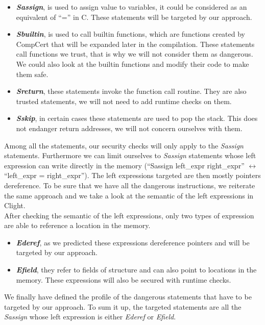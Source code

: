 \documentclass[11pt]{sdm}
\begin{document}
\begin{itemize}
	\item \textbf{\textit{Sassign}}, is used to assign value to variables, it could be considered as an equivalent of ``='' in C. These statements will be targeted by our approach.
	\item \textbf{\textit{Sbuiltin}}, is used to call builtin functions, which are functions created by CompCert that will be expanded later in the compilation. These statements call functions we trust, that is why we will not consider them as dangerous. We could also look at the builtin functions and modify their code to make them safe.
	\item \textbf{\textit{Sreturn}}, these statements invoke the function call routine. They are also trusted statements, we will not need to add runtime checks on them.
	\item \textbf{\textit{Sskip}}, in certain cases these statements are used to pop the stack. This does not endanger return addresses, we will not concern ourselves with them.
\end{itemize}
Among all the statements, our security checks will only apply to the \textit{Sassign} statements.
Furthermore we can limit ourselves to \textit{Sassign} statements whose left expression can write directly in the memory (``Sassign left\_expr right\_expr'' $\leftrightarrow$ ``left\_expr = right\_expr''). The left expressions targeted are then mostly pointers dereference. To be sure that we have all the dangerous instructions, we reiterate the same approach and we take a look at the semantic of the left expressions in Clight.\\
After checking the semantic of the left expressions, only two types of expression are able to reference a location in the memory.

\begin{itemize}
	\item \textbf{\textit{Ederef}}, as we predicted these expressions dereference pointers and will be targeted by our approach.
	\item \textbf{\textit{Efield}}, they refer to fields of structure and can also point to locations in the memory. These expressions will also be secured with runtime checks.
\end{itemize}

We finally have defined the profile of the dangerous statements that have to be targeted by our approach. To sum it up, the targeted statements are all the \textit{Sassign} whose left expression is either \textit{Ederef} or \textit{Efield}.
\end{document}
